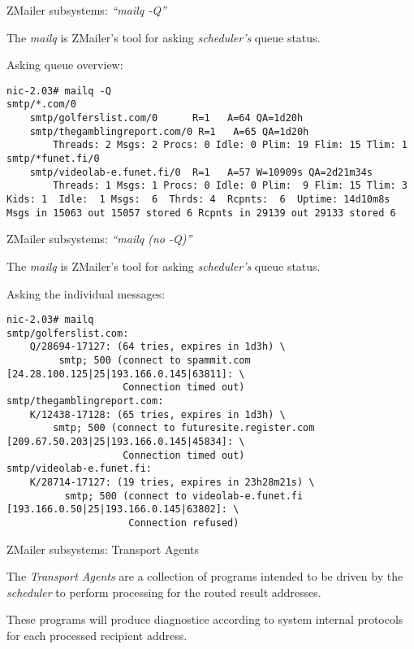\documentclass[a4paper,landscape]{slides}
\newcommand{\ZM}{ZMailer}
\begin{document}

\begin{slide}

\centerline{\large \ZM{} subsystems: {\it ``mailq -Q''}}

The {\it mailq} is \ZM's tool for asking {\it scheduler's} queue status.

Asking queue overview:

{\tiny
\begin{verbatim}
nic-2.03# mailq -Q
smtp/*.com/0
    smtp/golferslist.com/0      R=1   A=64 QA=1d20h
    smtp/thegamblingreport.com/0 R=1   A=65 QA=1d20h
        Threads: 2 Msgs: 2 Procs: 0 Idle: 0 Plim: 19 Flim: 15 Tlim: 1
smtp/*funet.fi/0
    smtp/videolab-e.funet.fi/0  R=1   A=57 W=10909s QA=2d21m34s
        Threads: 1 Msgs: 1 Procs: 0 Idle: 0 Plim:  9 Flim: 15 Tlim: 3
Kids: 1  Idle:  1 Msgs:  6  Thrds: 4  Rcpnts:  6  Uptime: 14d10m8s
Msgs in 15063 out 15057 stored 6 Rcpnts in 29139 out 29133 stored 6
\end{verbatim}
}
\vfill
\end{slide}
\begin{slide}

\centerline{\large \ZM{} subsystems: {\it ``mailq (no -Q)''}}

The {\it mailq} is \ZM's tool for asking {\it scheduler's} queue status.

Asking the individual messages:

{\tiny
\begin{verbatim}
nic-2.03# mailq
smtp/golferslist.com:
    Q/28694-17127: (64 tries, expires in 1d3h) \
         smtp; 500 (connect to spammit.com [24.28.100.125|25|193.166.0.145|63811]: \
                    Connection timed out)
smtp/thegamblingreport.com:
    K/12438-17128: (65 tries, expires in 1d3h) \
        smtp; 500 (connect to futuresite.register.com [209.67.50.203|25|193.166.0.145|45834]: \
                    Connection timed out)
smtp/videolab-e.funet.fi:
    K/28714-17127: (19 tries, expires in 23h28m21s) \
          smtp; 500 (connect to videolab-e.funet.fi [193.166.0.50|25|193.166.0.145|63802]: \
                     Connection refused)
\end{verbatim}
}
\vfill

\end{slide}



\begin{slide}

\centerline{\large \ZM{} subsystems: Transport Agents}

The {\it Transport Agents} are a collection of programs intended
to be driven by the {\it scheduler} to perform processing for
the routed result addresses.

These programs will produce diagnostice according to system internal
protocols for each processed recipient address.

\vfill

\end{slide}
\end{document}
